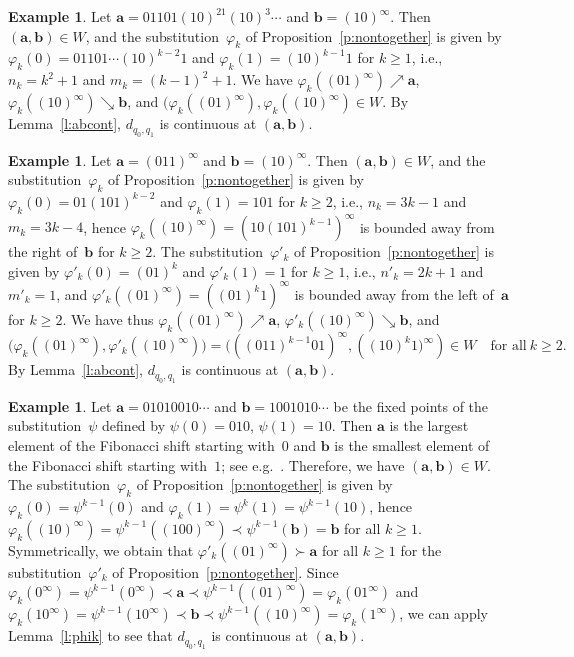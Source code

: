 \documentclass{amsart}
\theoremstyle{definition}
\newtheorem{example}[theorem]{Example}
\numberwithin{equation}{section}
\newcommand{\ba}{\mathbf{a}}
\newcommand{\bb}{\mathbf{b}}
\begin{document}
\begin{example}\label{ex1}
Let $\ba = 01101(10)^21(10)^3\cdots$ and $\bb = (10)^\infty$.
Then $(\ba, \bb) \in W$, and the substitution~$\varphi_k$ of Proposition~\ref{p:nontogether} is given by $\varphi_k(0) = 01101\cdots(10)^{k-2}1$ and $\varphi_k(1) = (10)^{k-1}1$ for $k \ge 1$, i.e., $n_k = k^2 {+} 1$ and $m_k = (k{-}1)^2 {+} 1$.
We have $\varphi_k((01)^\infty) \nearrow \ba$, $\varphi_k((10)^\infty) \searrow \bb$, and $(\varphi_k((01)^\infty), \varphi_k((10)^\infty) \in W$.
By Lemma~\ref{l:abcont}, $d_{q_0,q_1}$ is continuous at $(\ba,\bb)$. 
\end{example}

\begin{example}\label{ex2}
Let $\ba = (011)^\infty$ and $\bb = (10)^\infty$.
Then $(\ba, \bb) \in W$, and the substitution~$\varphi_k$ of Proposition~\ref{p:nontogether} is given by $\varphi_k(0) = 01(101)^{k-2}$ and $\varphi_k(1) = 101$ for $k \ge 2$, i.e., $n_k = 3k{-}1$ and $m_k = 3k{-}4$, hence $\varphi_k((10)^\infty) = (10(101)^{k-1})^\infty$ is bounded away from the right of~$\bb$ for $k \ge 2$.
The substitution~$\varphi'_k$ of Proposition~\ref{p:nontogether} is given by $\varphi'_k(0) = (01)^k$ and $\varphi'_k(1) = 1$ for $k \ge 1$, i.e., $n'_k = 2k{+}1$ and $m'_k = 1$, and $\varphi'_k((01)^\infty) = ((01)^k1)^\infty$ is bounded away from the left of~$\ba$ for $k \ge 2$.
We have thus $\varphi_k((01)^\infty) \nearrow \ba$, $\varphi'_k((10)^\infty) \searrow \bb$, and
\[
\big(\varphi_k((01)^\infty), \varphi'_k((10)^\infty)\big) = \big(((011)^{k-1}01)^\infty, ((10)^k1\big)^\infty) \in W \quad \mbox{for all}\ k \ge 2. 
\]
By Lemma~\ref{l:abcont}, $d_{q_0,q_1}$ is continuous at $(\ba,\bb)$. 
\end{example}

\begin{example} \label{ex3}
Let $\ba = 01010010\cdots$ and $\bb = 1001010 \cdots$ be the fixed points of the substitution~$\psi$ defined by $\psi(0) = 010$, $\psi(1) = 10$.
Then $\ba$ is the largest element of the Fibonacci shift starting with~$0$ and $\bb$ is the smallest element of the Fibonacci shift starting with~$1$; see e.g.~\cite{KomSteZou2022}.
Therefore, we have $(\ba,\bb) \in W$.
The substitution~$\varphi_k$ of Proposition~\ref{p:nontogether} is given by $\varphi_k(0) = \psi^{k-1}(0)$ and $\varphi_k(1) = \psi^k(1) = \psi^{k-1}(10)$, hence $\varphi_k((10)^\infty) = \psi^{k-1}((100)^\infty) \prec \psi^{k-1}(\bb) = \bb$ for all $k \ge 1$.
Symmetrically, we obtain that $\varphi'_k((01)^\infty) \succ \ba$ for all $k \ge 1$ for the substitution~$\varphi'_k$ of Proposition~\ref{p:nontogether}.
Since $\varphi_k(0^\infty) = \psi^{k-1}(0^\infty) \prec \ba \prec \psi^{k-1}((01)^\infty) = \varphi_k(01^\infty)$ and $\varphi_k(10^\infty) = \psi^{k-1}(10^\infty) \prec \bb \prec \psi^{k-1}((10)^\infty) = \varphi_k(1^\infty)$, we can apply Lemma~\ref{l:phik} to see that $d_{q_0,q_1}$ is continuous at $(\ba,\bb)$.
\end{example}
\end{document}
